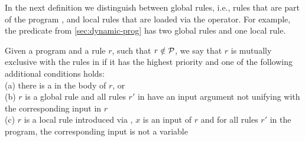 

In the next definition we distinguish between global rules,
i.e., rules that are part of the program \prog, and local rules that
are loaded via the \pi operator. For example, the  predicate
from \cref{sec:dynamic-prog} has two global rules and one local rule.

\begin{definition} \label{def:mutExcl}
  Given a program \prog and a rule $r$, such that $r\notin \mathcal{P}$,
  we say that $r$ is mutually exclusive with the rules in \prog if
  it has the highest priority and 
  one of the following additional conditions holds:\\
  (a) there is a \cut in the body of $r$, or\\
  (b) $r$ is a global rule and
      all rules $r'$ in \prog have an input argument not unifying
      with the corresponding input in $r$\\
  (c) $r$ is a local rule
      introduced via , 
      $x$ is an input of $r$ and for all rules $r'$ in the program,
      the corresponding input is not a variable
\end{definition}
%

